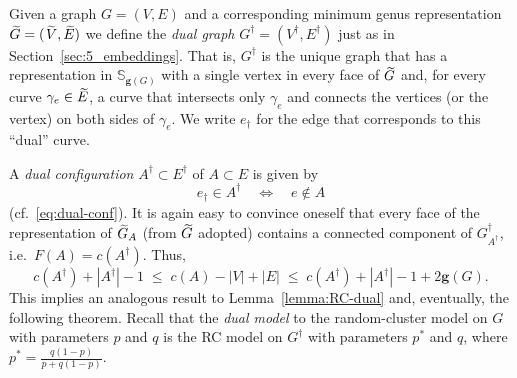 \documentclass{dis}
\theoremstyle{citing}
\begin{document}
Given a graph $G=(V,E)$ and a corresponding minimum genus 
representation ${\,\raisebox{2pt}{ ${\widetilde{{}}}$ }\mkern-15mu G}=({\,\raisebox{2pt}{ ${\widetilde{{}}}$ }\mkern-13mu V},{\,\raisebox{2pt}{ ${\widetilde{{}}}$ }\mkern-15mu E})$ we define the \emph{dual graph} 
$G^\dag=(V^\dag,E^\dag)$ 
just as in Section~\ref{sec:5_embeddings}. 
That is, $G^\dag$ is the unique graph that has a representation 
in ${\ensuremath{\mathbb{S}}}_{{\ensuremath{\mathbf{g}}}(G)}$ with a single vertex in every face of ${\,\raisebox{2pt}{ ${\widetilde{{}}}$ }\mkern-15mu G}$ 
and, for every curve ${\gamma}_e\in{\,\raisebox{2pt}{ ${\widetilde{{}}}$ }\mkern-15mu E}$, a curve that intersects only 
${\gamma}_e$ and connects the vertices (or the vertex) on both sides of 
${\gamma}_e$. We write $e_\dag$ for the edge that corresponds to this 
``dual'' curve.

A \emph{dual configuration} $A^\dag\subset E^\dag$ of $A\subset E$ 
is given by
\[
e_\dag\in A^\dag \quad\iff\quad e\notin A
\]
(cf.~\eqref{eq:dual-conf}).
It is again easy to convince oneself that every face of the 
representation of ${\,\raisebox{2pt}{ ${\widetilde{{}}}$ }\mkern-15mu G}_A$ (from ${\,\raisebox{2pt}{ ${\widetilde{{}}}$ }\mkern-15mu G}$ adopted) contains 
a connected component of $G^\dag_{A^\dag}$, 
i.e.~$F(A)=c(A^\dag)$. Thus, 
\begin{equation} \label{eq:dual-components2}
c(A^\dag) + {\left\vert {A^\dag} \right\vert} - 1
\;\le\; c(A) - {\left\vert {V} \right\vert} + {\left\vert {E} \right\vert}
\;\le\; c(A^\dag) + {\left\vert {A^\dag} \right\vert} - 1 +2{\ensuremath{\mathbf{g}}}(G).
\end{equation}
This implies an analogous result to Lemma~\ref{lemma:RC-dual} 
and, eventually, the following theorem. 
Recall that the \emph{dual model} to the random-cluster model 
on $G$ with parameters $p$ and $q$ is the RC model on $G^\dag$ 
with parameters $p^*$ and $q$, where $p^*=\frac{q(1-p)}{p+q(1-p)}$. 

\vspace{1mm}
\end{document}
